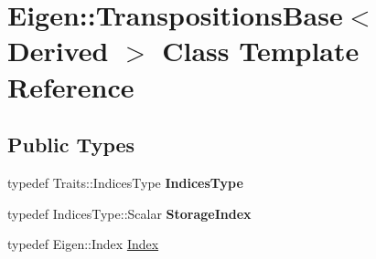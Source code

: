 \hypertarget{class_eigen_1_1_transpositions_base}{}\section{Eigen\+::Transpositions\+Base$<$ Derived $>$ Class Template Reference}
\label{class_eigen_1_1_transpositions_base}
\subsection*{Public Types}
\begin{DoxyCompactItemize}
\item 
\mbox{\label{class_eigen_1_1_transpositions_base_a9e7d155e0921e39a201a1da9bca1894d}} 
typedef Traits\+::\+Indices\+Type {\bfseries Indices\+Type}
\item 
\mbox{\label{class_eigen_1_1_transpositions_base_a82d8ab18b21c00a1c0fcf8448c8f63c1}} 
typedef Indices\+Type\+::\+Scalar {\bfseries Storage\+Index}
\item 
typedef Eigen\+::\+Index \mbox{\hyperlink{class_eigen_1_1_transpositions_base_a3f5f06118b419e8e6ccbe49ed5b4c91f}{Index}}
\end{DoxyCompactItemize}
